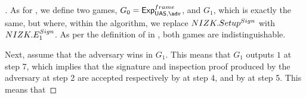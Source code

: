 \begin{proof}[]
  As for , we define two games, $G_0=\ExpNonframe$,
  and $G_1$, which is exactly the same, but where, within the \Setup algorithm,
  we replace $NIZK.Setup^{Sign}$ with $NIZK.E_1^{Sign}$. As per the
  definition of \NIZK in , both games are indistinguishable.

  Next, assume that the adversary wins in $G_1$. This means that $G_1$ outputs
  $1$ at step 7, which implies that the signature and inspection proof produced
  by the adversary at step 2 are accepted respectively by \Verify at step 4, and
  by \Judge at step 5. This means that 
\end{proof}


